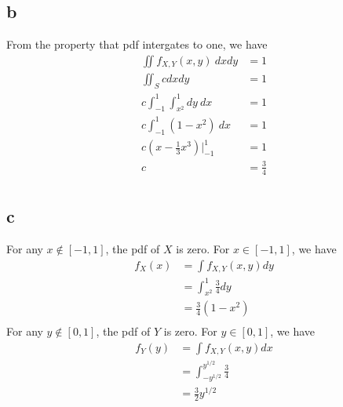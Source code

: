 \documentclass[12pt,letterpaper]{article}
\begin{document}
    \subsection*{b}
        From the property that pdf intergates to one, we have
        \begin{equation*}
            \begin{aligned}
                \iint f_{X, Y}(x, y)\ dxdy &= 1 \\
                \iint_{S} c dxdy &= 1 \\
                c\int_{-1}^{1} \int_{x^{2}}^{1} dy\ dx &= 1 \\
                c \int_{-1}^{1} (1 - x^{2})\ dx &= 1 \\
                c (x - \frac{1}{3}x^{3})|_{-1}^{1} &= 1 \\
                c &= \frac{3}{4} \\
            \end{aligned}
        \end{equation*}
    \subsection*{c}
        For any $x \not\in [-1, 1]$, the pdf of $X$ is zero. For $x \in [-1, 1]$, we have
        \begin{equation*}
            \begin{aligned}
                f_{X}(x) &= \int f_{X, Y}(x, y) dy \\
                &= \int_{x^{2}}^{1} \frac{3}{4} dy \\
                &= \frac{3}{4}(1 - x^{2}) \\
            \end{aligned}
        \end{equation*}
        For any $y \not\in [0, 1]$, the pdf of $Y$ is zero. For $y \in [0, 1]$, we have
        \begin{equation*}
            \begin{aligned}
                f_{Y}(y) &= \int f_{X, Y}(x, y) dx \\
                &= \int_{-y^{1/2}}^{y^{1/2}} \frac{3}{4} \\
                &= \frac{3}{2} y^{1/2} \\
            \end{aligned}
        \end{equation*}
\end{document}
